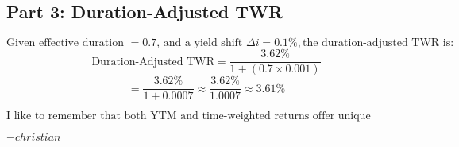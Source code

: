 \subsection*{Part 3: Duration-Adjusted TWR}
\(
\text{Given effective duration } = 0.7\text{, and a yield shift } \Delta i = 0.1\%, 
\text{the duration-adjusted TWR is:}
\)
\[
\text{Duration-Adjusted TWR} 
= \frac{3.62\%}{1 + (0.7 \times 0.001)}
\]
\[
= \frac{3.62\%}{1 + 0.0007}
\approx \frac{3.62\%}{1.0007}
\approx 3.61\%
\]

\begin{infobox}
\(
\text{I like to remember that both YTM and time-weighted returns offer unique insights. YTM estimates a constant discount rate for all cash flows, which is great for single-investment comparisons. Meanwhile, a time-weighted return handles varying cash inflows and outflows by measuring performance independent of deposits and withdrawals. Introducing duration helps account for interest rate shifts that can affect reinvestment. Understanding which metric fits your analysis scenario is the real key here.}
\)

\(
-christian
\)
\end{infobox}